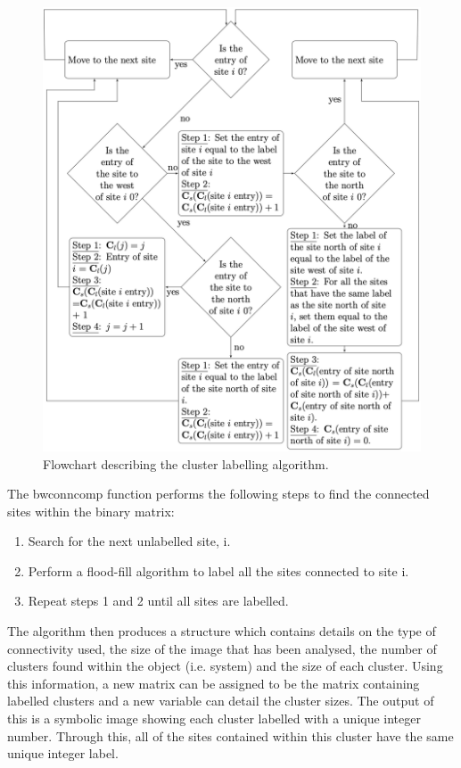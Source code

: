 \begin{figure}
    \centering
    \includegraphics[scale=0.55]{appendix/figures/CCA-Flow.pdf}
    \caption{Flowchart describing the cluster labelling algorithm.}
    \label{fig:my_label}
\end{figure}

\newpage

The bwconncomp function performs the following steps to find the connected sites within the binary matrix:
\begin{enumerate}
    \item Search for the next unlabelled site, i.
    \item Perform a flood-fill algorithm to label all the sites connected to site i.
    \item Repeat steps 1 and 2 until all sites are labelled.
\end{enumerate}

The algorithm then produces a structure which contains details on the type of connectivity used, 
the size of the image that has been analysed, the number of clusters found within the object (i.e. system) and the size of each cluster. 
Using this information, a new matrix can be assigned to be the matrix containing labelled clusters and a new variable can detail the cluster sizes. 
The output of this is a symbolic image showing each cluster labelled with a unique integer number. 
Through this, all of the sites contained within this cluster have the same unique integer label.

